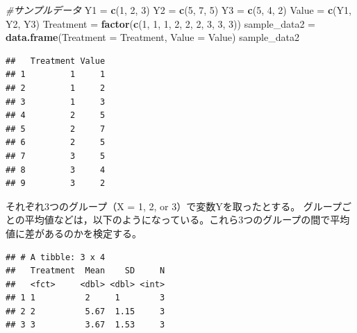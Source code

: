 \documentclass[]{article}
\newenvironment{Shaded}{\begin{snugshade}}{\end{snugshade}}
\newcommand{\KeywordTok}[1]{\textcolor[rgb]{0.13,0.29,0.53}{\textbf{#1}}}
\newcommand{\DataTypeTok}[1]{\textcolor[rgb]{0.13,0.29,0.53}{#1}}
\newcommand{\DecValTok}[1]{\textcolor[rgb]{0.00,0.00,0.81}{#1}}
\newcommand{\StringTok}[1]{\textcolor[rgb]{0.31,0.60,0.02}{#1}}
\newcommand{\CommentTok}[1]{\textcolor[rgb]{0.56,0.35,0.01}{\textit{#1}}}
\newcommand{\OperatorTok}[1]{\textcolor[rgb]{0.81,0.36,0.00}{\textbf{#1}}}
\newcommand{\NormalTok}[1]{#1}
\begin{document}
\begin{Shaded}
\begin{Highlighting}[]
\CommentTok{#サンプルデータ}
\NormalTok{Y1 =}\StringTok{ }\KeywordTok{c}\NormalTok{(}\DecValTok{1}\NormalTok{, }\DecValTok{2}\NormalTok{, }\DecValTok{3}\NormalTok{)}
\NormalTok{Y2 =}\StringTok{ }\KeywordTok{c}\NormalTok{(}\DecValTok{5}\NormalTok{, }\DecValTok{7}\NormalTok{, }\DecValTok{5}\NormalTok{)}
\NormalTok{Y3 =}\StringTok{ }\KeywordTok{c}\NormalTok{(}\DecValTok{5}\NormalTok{, }\DecValTok{4}\NormalTok{, }\DecValTok{2}\NormalTok{)}
\NormalTok{Value =}\StringTok{ }\KeywordTok{c}\NormalTok{(Y1, Y2, Y3)}
\NormalTok{Treatment =}\StringTok{ }\KeywordTok{factor}\NormalTok{(}\KeywordTok{c}\NormalTok{(}\DecValTok{1}\NormalTok{, }\DecValTok{1}\NormalTok{, }\DecValTok{1}\NormalTok{, }\DecValTok{2}\NormalTok{, }\DecValTok{2}\NormalTok{, }\DecValTok{2}\NormalTok{, }\DecValTok{3}\NormalTok{, }\DecValTok{3}\NormalTok{, }\DecValTok{3}\NormalTok{))}
\NormalTok{sample_data2 =}\StringTok{ }\KeywordTok{data.frame}\NormalTok{(}\DataTypeTok{Treatment =}\NormalTok{ Treatment, }\DataTypeTok{Value =}\NormalTok{ Value)}
\NormalTok{sample_data2}
\end{Highlighting}
\end{Shaded}

\begin{verbatim}
##   Treatment Value
## 1         1     1
## 2         1     2
## 3         1     3
## 4         2     5
## 5         2     7
## 6         2     5
## 7         3     5
## 8         3     4
## 9         3     2
\end{verbatim}

それぞれ3つのグループ（X = 1, 2, or 3）で変数Yを取ったとする。
グループごとの平均値などは，以下のようになっている。これら3つのグループの間で平均値に差があるのかを検定する。

\begin{Shaded}
\end{Shaded}

\begin{verbatim}
## # A tibble: 3 x 4
##   Treatment  Mean    SD     N
##   <fct>     <dbl> <dbl> <int>
## 1 1          2     1        3
## 2 2          5.67  1.15     3
## 3 3          3.67  1.53     3
\end{verbatim}
\end{document}

